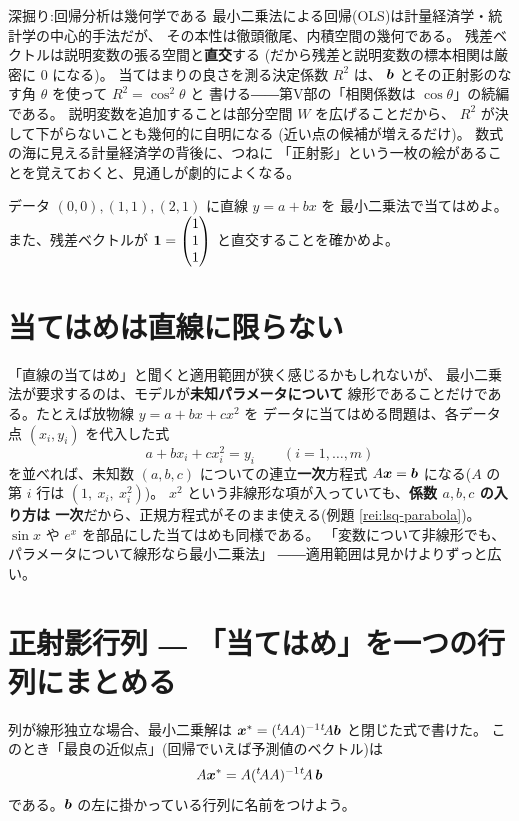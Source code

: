\begin{itembox}[l]{深掘り:回帰分析は幾何学である}
最小二乗法による回帰(OLS)は計量経済学・統計学の中心的手法だが、
その本性は徹頭徹尾、内積空間の幾何である。
残差ベクトルは説明変数の張る空間と\textbf{直交}する
(だから残差と説明変数の標本相関は厳密に $0$ になる)。
当てはまりの良さを測る決定係数 $R^2$ は、
$\bm{b}$ とその正射影のなす角 $\theta$ を使って $R^2 = \cos^2\theta$ と
書ける――第V部の「相関係数は $\cos\theta$」の続編である。
説明変数を追加することは部分空間 $W$ を広げることだから、
$R^2$ が決して下がらないことも幾何的に自明になる
(近い点の候補が増えるだけ)。
数式の海に見える計量経済学の背後に、つねに
「正射影」という一枚の絵があることを覚えておくと、見通しが劇的によくなる。
\end{itembox}

\begin{mondai}\label{q:lsq}
データ $(0, 0), (1, 1), (2, 1)$ に直線 $y = a + bx$ を
最小二乗法で当てはめよ。また、残差ベクトルが
$\bm{1} = \begin{pmatrix}1 \\ 1 \\ 1\end{pmatrix}$ と直交することを確かめよ。
\end{mondai}

\section{当てはめは直線に限らない}

「直線の当てはめ」と聞くと適用範囲が狭く感じるかもしれないが、
最小二乗法が要求するのは、モデルが\textbf{未知パラメータについて}
線形であることだけである。たとえば放物線 $y = a + bx + cx^2$ を
データに当てはめる問題は、各データ点 $(x_i, y_i)$ を代入した式
\[
a + b x_i + c x_i^2 = y_i \qquad (i = 1, \dots, m)
\]
を並べれば、未知数 $(a, b, c)$ についての連立\textbf{一次}方程式
$A\bm{x} = \bm{b}$ になる($A$ の第 $i$ 行は $(1,\ x_i,\ x_i^2)$)。
$x^2$ という非線形な項が入っていても、\textbf{係数 $a, b, c$ の入り方は
一次}だから、正規方程式がそのまま使える(例題 \ref{rei:lsq-parabola})。
$\sin x$ や $e^x$ を部品にした当てはめも同様である。
「変数について非線形でも、パラメータについて線形なら最小二乗法」
――適用範囲は見かけよりずっと広い。

\section{正射影行列 ― 「当てはめ」を一つの行列にまとめる}

列が線形独立な場合、最小二乗解は
$\bm{x}^* = ({}^t\!AA)^{-1}{}^t\!A\bm{b}$ と閉じた式で書けた。
このとき「最良の近似点」(回帰でいえば予測値のベクトル)は
\[
A\bm{x}^* = A({}^t\!AA)^{-1}{}^t\!A\,\bm{b}
\]
である。$\bm{b}$ の左に掛かっている行列に名前をつけよう。

